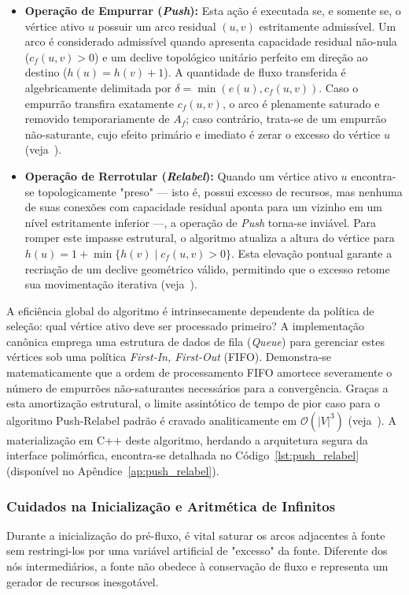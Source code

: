 \documentclass[12pt,a4paper]{article}
\begin{document}
\begin{itemize}
    \item \textbf{Operação de Empurrar (\textit{Push}):} Esta ação é executada se, e somente se, o vértice ativo $u$ possuir um arco residual $(u,v)$ estritamente admissível. Um arco é considerado admissível quando apresenta capacidade residual não-nula ($c_f(u,v) > 0$) e um declive topológico unitário perfeito em direção ao destino ($h(u) = h(v) + 1$). A quantidade de fluxo transferida é algebricamente delimitada por $\delta = \min(e(u), c_f(u,v))$. Caso o empurrão transfira exatamente $c_f(u,v)$, o arco é plenamente saturado e removido temporariamente de $A_f$; caso contrário, trata-se de um empurrão não-saturante, cujo efeito primário e imediato é zerar o excesso do vértice $u$ (veja~\cite{cook1998combinatorial}).

    \item \textbf{Operação de Rerrotular (\textit{Relabel}):} Quando um vértice ativo $u$ encontra-se topologicamente "preso" — isto é, possui excesso de recursos, mas nenhuma de suas conexões com capacidade residual aponta para um vizinho em um nível estritamente inferior —, a operação de \textit{Push} torna-se inviável. Para romper este impasse estrutural, o algoritmo atualiza a altura do vértice para $h(u) = 1 + \min \{h(v) \mid c_f(u,v) > 0\}$. Esta elevação pontual garante a recriação de um declive geométrico válido, permitindo que o excesso retome sua movimentação iterativa (veja~\cite{korte2018combinatorial}).
\end{itemize}

A eficiência global do algoritmo é intrinsecamente dependente da política de seleção: qual vértice ativo deve ser processado primeiro? A implementação canônica emprega uma estrutura de dados de fila (\textit{Queue}) para gerenciar estes vértices sob uma política \textit{First-In, First-Out} (FIFO). Demonstra-se matematicamente que a ordem de processamento FIFO amortece severamente o número de empurrões não-saturantes necessários para a convergência. Graças a esta amortização estrutural, o limite assintótico de tempo de pior caso para o algoritmo Push-Relabel padrão é cravado analiticamente em $\mathcal{O}(|V|^3)$ (veja~\cite{goldberg1988new}). A materialização em C++ deste algoritmo, herdando a arquitetura segura da interface polimórfica, encontra-se detalhada no Código~\ref{lst:push_relabel} (disponível no Apêndice~\ref{ap:push_relabel}).

\subsubsection{Cuidados na Inicialização e Aritmética de Infinitos}
Durante a inicialização do pré-fluxo, é vital saturar os arcos adjacentes à fonte sem restringi-los por uma variável artificial de "excesso" da fonte. Diferente dos nós intermediários, a fonte não obedece à conservação de fluxo e representa um gerador de recursos inesgotável. 
\end{document}
